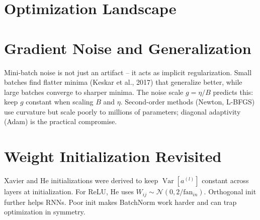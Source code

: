 \section{Optimization Landscape}
\begin{center}
\end{center}

\section{Gradient Noise and Generalization}
Mini-batch noise is not just an artifact -- it acts as implicit regularization.
Small batches find flatter minima (Keskar et al., 2017) that generalize better,
while large batches converge to sharper minima. The noise scale
$g=\eta/B$ predicts this: keep $g$ constant when scaling $B$ and $\eta$.
Second-order methods (Newton, L-BFGS) use curvature but scale poorly to millions
of parameters; diagonal adaptivity (Adam) is the practical compromise.

\section{Weight Initialization Revisited}
Xavier and He initializations were derived to keep $\operatorname{Var}[a^{(l)}]$
constant across layers at initialization. For ReLU, He uses
$W_{ij}\sim\mathcal{N}(0,2/\text{fan}_{in})$. Orthogonal init further helps RNNs.
Poor init makes BatchNorm work harder and can trap optimization in symmetry.

